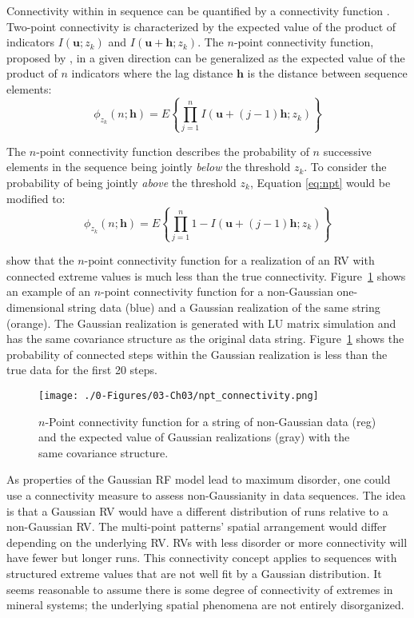 Connectivity within in sequence can be quantified by a connectivity function \citep{renard2011conditioning}. Two-point connectivity is characterized by the expected value of the product of indicators $I(\mathbf{u}; z_{k})$ and $I(\mathbf{u}+\mathbf{h}; z_{k})$. The $n\text{-point}$ connectivity function, proposed by \cite{journel1989nongaussian}, in a given direction can be generalized as the expected value of the product of $n$ indicators where the lag distance $\mathbf{h}$ is the distance between sequence elements:
\begin{equation}
    \phi_{z_{k}}(n;\mathbf{h}) = E\left\{\prod_{j=1}^{n} I(\mathbf{u} + (j-1)\mathbf{h}; z_{k})\right\}
    \label{eq:npt}
\end{equation}

The $n\text{-point}$ connectivity function describes the probability of $n$ successive elements in the sequence being jointly \emph{below} the threshold $z_{k}$. To consider the probability of being jointly \emph{above} the threshold $z_{k}$, Equation \ref{eq:npt} would be modified to:
\begin{equation}
    \phi_{z_{k}}(n;\mathbf{h}) = E\left\{\prod_{j=1}^{n} 1 - I(\mathbf{u} + (j-1)\mathbf{h}; z_{k})\right\}
    \label{eq:npt2}
\end{equation}

\cite{journel1989nongaussian} show that the $n\text{-point}$ connectivity function for a realization of an \gls{RV} with connected extreme values is much less than the true connectivity. Figure~\ref{fig:npt_connectivity} shows an example of an $n\text{-point}$ connectivity function for a non-Gaussian one-dimensional string data (blue) and a Gaussian realization of the same string (orange). The Gaussian realization is generated with LU matrix simulation and has the same covariance structure as the original data string. Figure~\ref{fig:npt_connectivity} shows the probability of connected steps within the Gaussian realization is less than the true data for the first 20 steps.

\begin{figure}[htb!]
    \centering
    \texttt{[image: ./0-Figures/03-Ch03/npt\_connectivity.png]}
    \caption{$n$-Point connectivity function for a string of non-Gaussian data (reg) and the expected value of Gaussian realizations (gray) with the same covariance structure.}
    \label{fig:npt_connectivity}
\end{figure}

As properties of the Gaussian \gls{RF} model lead to maximum disorder, one could use a connectivity measure to assess non-Gaussianity in data sequences. The idea is that a Gaussian \gls{RV} would have a different distribution of runs relative to a non-Gaussian \gls{RV}. The multi-point patterns' spatial arrangement would differ depending on the underlying \gls{RV}. \Glspl{RV} with less disorder or more connectivity will have fewer but longer runs. This connectivity concept applies to sequences with structured extreme values that are not well fit by a Gaussian distribution. It seems reasonable to assume there is some degree of connectivity of extremes in mineral systems; the underlying spatial phenomena are not entirely disorganized.


